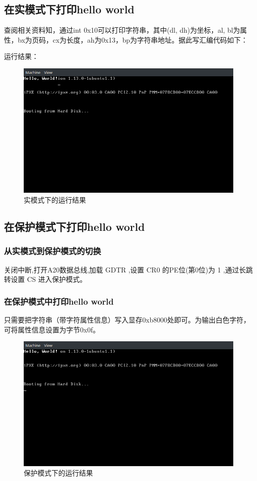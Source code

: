 \documentclass[12pt,a4paper,UTF8]{article}
\begin{document}
\subsection{在实模式下打印hello world}
查阅相关资料知，通过int 0x10可以打印字符串，其中(dl, dh)为坐标，al, bl为属性，bx为页码，cx为长度，ah为0x13，bp为字符串地址。据此写汇编代码如下：

运行结果：
\begin{figure}[htbp]
	\centering
	\includegraphics[width=\textwidth]{real}
	\caption{实模式下的运行结果}
\end{figure}

\subsection{在保护模式下打印hello world}
\subsubsection{从实模式到保护模式的切换}
关闭中断,打开A20数据总线,加载 GDTR ,设置 CR0 的PE位(第0位)为 1 ,通过长跳转设置 CS 进入保护模式。

\subsubsection{在保护模式中打印hello world}
只需要把字符串（带字符属性信息）写入显存0xb8000处即可。为输出白色字符，可将属性信息设置为字节0x0f。

\begin{figure}[htbp]
	\centering
	\includegraphics[width=\textwidth]{protected}
	\caption{保护模式下的运行结果}
\end{figure}
\end{document}
